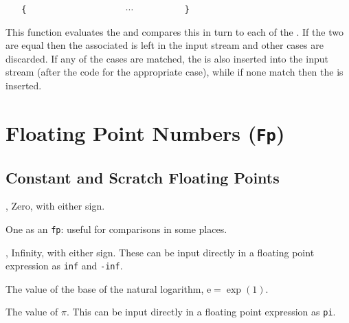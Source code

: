 \documentclass[oneside]{book}
\begin{document}
\begin{function}{\IntCaseTF}
\begin{syntax}
 
~ ~ \verb|{|
~ ~ ~ ~  
~ ~ ~ ~  
~ ~ ~ ~ $\cdots$
~ ~ ~ ~  
~ ~ \verb|}|
~ ~ 
~ ~ 
\end{syntax}
This function evaluates the  and
compares this in turn to each of the
. If the two are equal then the
associated  is left in the input stream
and other cases are discarded. If any of the
cases are matched, the  is also inserted into the
input stream (after the code for the appropriate case), while if none
match then the  is inserted.
\end{function}

\chapter{Floating Point Numbers (\texttt{Fp})}

\section{Constant and Scratch Floating Points}

\begin{variable}{\cZeroFp, \cMinusZeroFp}
Zero, with either sign.
\end{variable}

\begin{variable}{\cOneFp}
One as an \texttt{fp}: useful for comparisons in some places.
\end{variable}

\begin{variable}{\cInfFp,\cMinusInfFp}
Infinity, with either sign. These can be input directly in a
floating point expression as \texttt{inf} and \texttt{-inf}.
\end{variable}

\begin{variable}{\cEFp}
The value of the base of the natural logarithm, $\mathrm{e} = \exp(1)$.
\end{variable}

\begin{variable}{\cPiFp}
The value of $\pi$.  This can be input directly in a floating point
expression as \texttt{pi}.
\end{variable}
\end{document}

